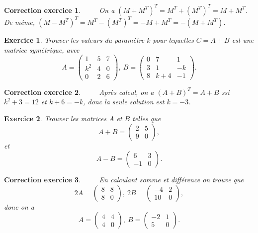 \documentclass[12pt]{article}
\newtheorem{exercice}{\bf Exercice}
\newtheorem{correction}{\bf Correction exercice}
\newenvironment{exo}{
\begin{exercice}\smallskip\normalfont}{\end{exercice}
}
\newenvironment{cor}{
\begin{correction}\smallskip\normalfont}{\end{correction}
}
\newif\ifcorrige\corrigetrue
\begin{document}
\ifcorrige
\color{magenta}
\begin{cor}
  $\qquad$ On a $(M+M^T)^T=M^T+(M^T)^T=M+M^T$. De m\^eme, $(M-M^T)^T=M^T-(M^T)^T=-M+M^T=-(M+M^T)$.
\end{cor}
\color{black}
\fi

\begin{exo}
Trouver les valeurs du param\`etre $k$ pour lequelles $C=A+B$ est une matrice sym\'etrique, avec
$$A= \left ( \begin{array}{ccc} 1&5&7\\k^2&4&0\\0&2&6  \end{array}     \right),\ B= \left ( \begin{array}{ccc} 0&7&1\\3&1&-k\\8&k+4&-1  \end{array}     \right).$$
\end{exo}
\ifcorrige
\color{magenta}
\begin{cor}
  $\qquad$ Apr\`es calcul, on a $(A+B)^T=A+B$ ssi $k^2+3=12$ et $k+6=-k$, donc la seule solution est $k=-3$.
\end{cor}
\color{black}
\fi
\begin{exo}
 Trouver les matrices $A$ et $B$ telles que
 $$A+B=\left ( \begin{array}{cc} 2&5\\9&0    \end{array}     \right),$$
 et
 $$A-B=\left ( \begin{array}{cc} 6&3\\-1&0    \end{array}     \right).$$
\end{exo}
\ifcorrige
\color{magenta}
\begin{cor}
  $\qquad$ En calculant somme et diff\'erence on trouve que
  $$2A=\left ( \begin{array}{cc} 8&8\\8&0    \end{array}     \right),\ 2B=\left ( \begin{array}{cc} -4&2\\10&0    \end{array}     \right),$$
  donc on a
  $$A=\left ( \begin{array}{cc} 4&4\\4&0    \end{array}     \right),\ B=\left ( \begin{array}{cc} -2&1\\5&0    \end{array}     \right).$$
  \end{cor}
\end{document}
